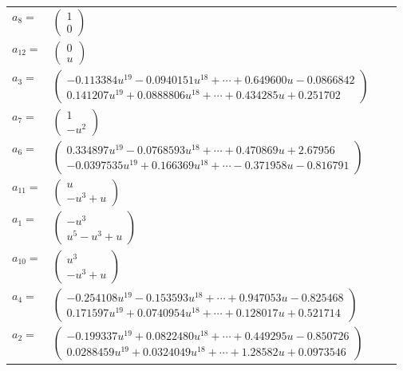 \documentclass[1p]{elsarticle_modified}
\theoremstyle{definition}
\begin{document}
\begin{tabular}{m{7pt} m{180pt} m{7pt} m{180pt} }
\flushright $a_{8}=$&$\begin{pmatrix}1\\0\end{pmatrix}$ \\
\flushright $a_{12}=$&$\begin{pmatrix}0\\u\end{pmatrix}$ \\
\flushright $a_{3}=$&$\begin{pmatrix}-0.113384 u^{19}-0.0940151 u^{18}+\cdots+0.649600 u-0.0866842\\0.141207 u^{19}+0.0888806 u^{18}+\cdots+0.434285 u+0.251702\end{pmatrix}$ \\
\flushright $a_{7}=$&$\begin{pmatrix}1\\- u^2\end{pmatrix}$ \\
\flushright $a_{6}=$&$\begin{pmatrix}0.334897 u^{19}-0.0768593 u^{18}+\cdots+0.470869 u+2.67956\\-0.0397535 u^{19}+0.166369 u^{18}+\cdots-0.371958 u-0.816791\end{pmatrix}$ \\
\flushright $a_{11}=$&$\begin{pmatrix}u\\- u^3+u\end{pmatrix}$ \\
\flushright $a_{1}=$&$\begin{pmatrix}- u^3\\u^5- u^3+u\end{pmatrix}$ \\
\flushright $a_{10}=$&$\begin{pmatrix}u^3\\- u^3+u\end{pmatrix}$ \\
\flushright $a_{4}=$&$\begin{pmatrix}-0.254108 u^{19}-0.153593 u^{18}+\cdots+0.947053 u-0.825468\\0.171597 u^{19}+0.0740954 u^{18}+\cdots+0.128017 u+0.521714\end{pmatrix}$ \\
\flushright $a_{2}=$&$\begin{pmatrix}-0.199337 u^{19}+0.0822480 u^{18}+\cdots+0.449295 u-0.850726\\0.0288459 u^{19}+0.0324049 u^{18}+\cdots+1.28582 u+0.0973546\end{pmatrix}$ \\

\end{tabular}
\end{document}
